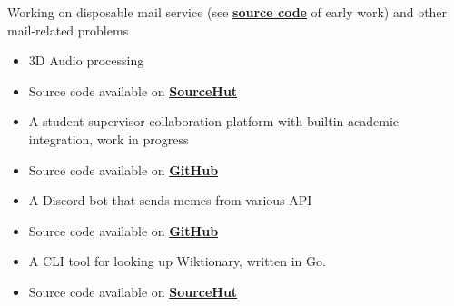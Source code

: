 
Working on disposable mail service (see \textbf{\href{https://github.com/Huy-Ngo/temp-mail} {source code}} of early work) and other mail-related problems


\begin{itemize}
\item 3D Audio processing
\item Source code available on \textbf{\href{https://sr.ht/~cnx/palace}{SourceHut}}
\end{itemize}

\divider

\begin{itemize}
\item A student-supervisor collaboration platform with builtin academic integration, work in progress
\item Source code available on \textbf{\href{https://github.com/Huy-Ngo/acanban}{GitHub}}
\end{itemize}

\divider

\begin{itemize}
\item A Discord bot that sends memes from various API
\item Source code available on \textbf{\href{https://github.com/Huy-Ngo/discord-meme-bot}{GitHub}}
\end{itemize}

\divider

\begin{itemize}
\item A CLI tool for looking up Wiktionary, written in Go.
\item Source code available on \textbf{\href{https://sr.ht/~huyngo/wikt-cli}{SourceHut}}
\end{itemize}
